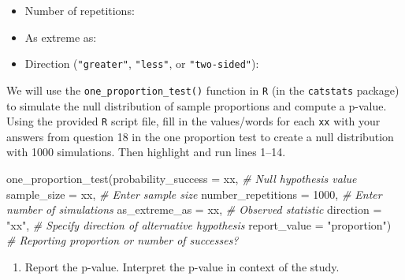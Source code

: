 \documentclass[
]{report}
\newenvironment{Shaded}{\begin{snugshade}}{\end{snugshade}}
\newcommand{\AttributeTok}[1]{\textcolor[rgb]{0.77,0.63,0.00}{#1}}
\newcommand{\CommentTok}[1]{\textcolor[rgb]{0.56,0.35,0.01}{\textit{#1}}}
\newcommand{\DecValTok}[1]{\textcolor[rgb]{0.00,0.00,0.81}{#1}}
\newcommand{\FunctionTok}[1]{\textcolor[rgb]{0.00,0.00,0.00}{#1}}
\newcommand{\NormalTok}[1]{#1}
\newcommand{\StringTok}[1]{\textcolor[rgb]{0.31,0.60,0.02}{#1}}
\providecommand{\tightlist}{%
  \setlength{\itemsep}{0pt}\setlength{\parskip}{0pt}}
\begin{document}
\vspace{.2in}

\begin{itemize}
\tightlist
\item
  Number of repetitions:
\end{itemize}

\vspace{.2in}

\begin{itemize}
\tightlist
\item
  As extreme as:
\end{itemize}

\vspace{.2in}

\begin{itemize}
\tightlist
\item
  Direction (\texttt{"greater"}, \texttt{"less"}, or \texttt{"two-sided"}):
\end{itemize}

\vspace{.2in}

We will use the \texttt{one\_proportion\_test()} function in \texttt{R} (in the \texttt{catstats} package) to simulate the null distribution of sample proportions and compute a p-value. Using the provided \texttt{R} script file, fill in the values/words for each \texttt{xx} with your answers from question 18 in the one proportion test to create a null distribution with 1000 simulations. Then highlight and run lines 1--14.

\begin{Shaded}
\begin{Highlighting}[]
\FunctionTok{one\_proportion\_test}\NormalTok{(}\AttributeTok{probability\_success =}\NormalTok{ xx, }\CommentTok{\# Null hypothesis value}
          \AttributeTok{sample\_size =}\NormalTok{ xx, }\CommentTok{\# Enter sample size}
          \AttributeTok{number\_repetitions =} \DecValTok{1000}\NormalTok{, }\CommentTok{\# Enter number of simulations}
          \AttributeTok{as\_extreme\_as =}\NormalTok{ xx, }\CommentTok{\# Observed statistic}
          \AttributeTok{direction =} \StringTok{"xx"}\NormalTok{, }\CommentTok{\# Specify direction of alternative hypothesis}
          \AttributeTok{report\_value =} \StringTok{"proportion"}\NormalTok{) }\CommentTok{\# Reporting proportion or number of successes?}
\end{Highlighting}
\end{Shaded}

\begin{enumerate}
\def\labelenumi{\arabic{enumi}.}
\setcounter{enumi}{7}
\tightlist
\item
  Report the p-value. Interpret the p-value in context of the study.
\end{enumerate}
\end{document}
